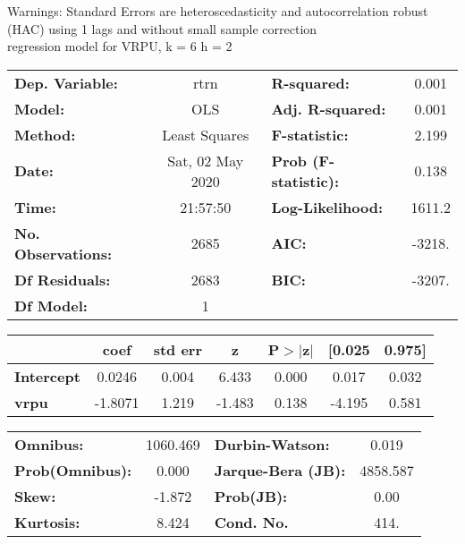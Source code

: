 Warnings: \newline
 [1] Standard Errors are heteroscedasticity and autocorrelation robust (HAC) using 1 lags and without small sample correction\\ 

regression model for VRPU, k = 6 h = 2\begin{center}
\begin{tabular}{lclc}
\toprule
\textbf{Dep. Variable:}    &       rtrn       & \textbf{  R-squared:         } &     0.001   \\
\textbf{Model:}            &       OLS        & \textbf{  Adj. R-squared:    } &     0.001   \\
\textbf{Method:}           &  Least Squares   & \textbf{  F-statistic:       } &     2.199   \\
\textbf{Date:}             & Sat, 02 May 2020 & \textbf{  Prob (F-statistic):} &    0.138    \\
\textbf{Time:}             &     21:57:50     & \textbf{  Log-Likelihood:    } &    1611.2   \\
\textbf{No. Observations:} &        2685      & \textbf{  AIC:               } &    -3218.   \\
\textbf{Df Residuals:}     &        2683      & \textbf{  BIC:               } &    -3207.   \\
\textbf{Df Model:}         &           1      & \textbf{                     } &             \\
\bottomrule
\end{tabular}
\begin{tabular}{lcccccc}
                   & \textbf{coef} & \textbf{std err} & \textbf{z} & \textbf{P$> |$z$|$} & \textbf{[0.025} & \textbf{0.975]}  \\
\midrule
\textbf{Intercept} &       0.0246  &        0.004     &     6.433  &         0.000        &        0.017    &        0.032     \\
\textbf{vrpu}      &      -1.8071  &        1.219     &    -1.483  &         0.138        &       -4.195    &        0.581     \\
\bottomrule
\end{tabular}
\begin{tabular}{lclc}
\textbf{Omnibus:}       & 1060.469 & \textbf{  Durbin-Watson:     } &    0.019  \\
\textbf{Prob(Omnibus):} &   0.000  & \textbf{  Jarque-Bera (JB):  } & 4858.587  \\
\textbf{Skew:}          &  -1.872  & \textbf{  Prob(JB):          } &     0.00  \\
\textbf{Kurtosis:}      &   8.424  & \textbf{  Cond. No.          } &     414.  \\
\bottomrule
\end{tabular}
\end{center}

